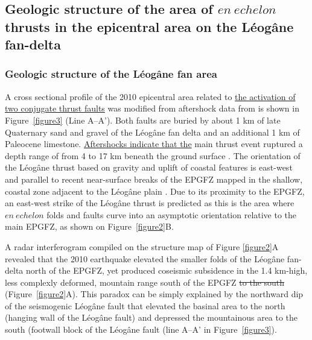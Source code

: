 \documentclass[linenumbers,draft]{agujournal}
\begin{document}
\subsection{Geologic structure of the area of $en~echelon$ thrusts in the epicentral area on the L\'eog\^ane fan-delta}
\subsubsection{Geologic structure of the L\'eog\^ane fan area}
A cross sectional profile of the 2010 epicentral area related to \ul{the activation of two conjugate thrust faults} was modified from aftershock data from \citet{douilly2013crustal,douilly2015three} is shown in Figure~\ref{figure3} (Line A--A'). Both faults are buried by about 1 km of late Quaternary sand and gravel of the L\'eog\^ane fan delta \citep{kocel2016near} and an additional 1 km of Paleocene limestone. \ul{Aftershocks indicate that the} main thrust event ruptured a depth range of from 4 to 17 km beneath the ground surface \citep{douilly2013crustal,douilly2015three}. The orientation of the L\'eog\^ane thrust based on gravity and uplift of coastal features is east-west and parallel to recent near-surface breaks of the EPGFZ mapped in the shallow, coastal zone adjacent to the L\'eog\^ane plain \citep{hornbach2010high}. Due to its proximity to the EPGFZ, an east-west strike of the L\'eog\^ane thrust is predicted as this is the area where $en~echelon$ folds and faults curve into an asymptotic orientation relative to the main EPGFZ, as shown on Figure~\ref{figure2}B.

A radar interferogram compiled on the structure map of Figure \ref{figure2}A revealed that the 2010 earthquake elevated the smaller folds of the L\'eog\^ane fan-delta north of the EPGFZ, yet produced coseismic subsidence in the 1.4 km-high, less complexly deformed, mountain range south of the EPGFZ \st{to the south} \citep{hashimoto2011fan} (Figure~\ref{figure2}A). This paradox can be simply explained by the northward dip of the seismogenic L\'eog\^ane fault that elevated the basinal area to the north (hanging wall of the L\'eog\^ane fault) and depressed the mountainous area to the south (footwall block of the L\'eog\^ane fault (line A--A' in Figure~\ref{figure3}). 
\end{document}

